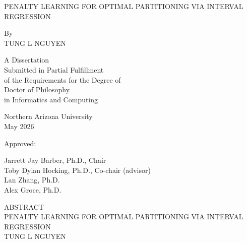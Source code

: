 \documentclass[12pt]{article}
\date{}
\begin{document}
\begin{titlepage}
\thispagestyle{empty}

\begin{center}

{\MakeUppercase{PENALTY LEARNING FOR OPTIMAL PARTITIONING VIA INTERVAL REGRESSION}}\\
\vspace{2\baselineskip}

By\\
\vspace{\baselineskip}
\MakeUppercase{Tung L Nguyen}\\

\vspace{2\baselineskip}

A Dissertation\\
Submitted in Partial Fulfillment\\
of the Requirements for the Degree of\\
Doctor of Philosophy\\
in Informatics and Computing\\

\vspace{2\baselineskip}

Northern Arizona University\\
May 2026\\

\vfill

Approved:\\
\vspace{\baselineskip}

Jarrett Jay Barber, Ph.D., Chair\\
Toby Dylan Hocking, Ph.D., Co-chair (advisor)\\
Lan Zhang, Ph.D.\\
Alex Groce, Ph.D.\\

\end{center}

\end{titlepage}

\clearpage
\setcounter{page}{2}
\renewcommand{\thepage}{\roman{page}}

{}

\thispagestyle{empty}

\begin{center}
ABSTRACT\\
\MakeUppercase{PENALTY LEARNING FOR OPTIMAL PARTITIONING VIA INTERVAL REGRESSION}\\
\MakeUppercase{Tung L Nguyen}
\end{center}
\end{document}
